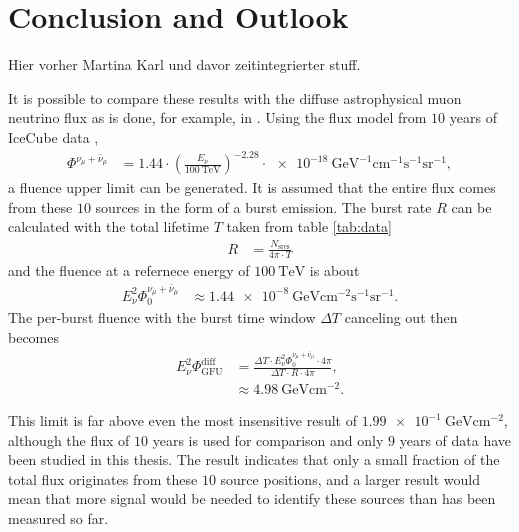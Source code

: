\chapter{Conclusion and Outlook} \label{sec:outlook}

Hier vorher Martina Karl und davor zeitintegrierter stuff.

It is possible to compare these results with the diffuse astrophysical muon neutrino flux as is done, for example, in \cite{thorben}.
Using the flux model from $\num{10}$ years of IceCube data \cite{flux_2},
\begin{align}
  \Phi^{\nu_\mu + \bar{\nu}_\mu} &= 1.44\cdot\left(\frac{E_\nu}{\SI{100}{\tera\electronvolt}}\right)^{-2.28}\cdot\SI{e-18}{\giga\electronvolt\tothe{-1}\centi\meter\tothe{-1}\second\tothe{-1}\steradian\tothe{-1}},
\end{align}
a fluence upper limit can be generated.
It is assumed that the entire flux comes from these $\num{10}$ sources in the form of a burst emission.
The burst rate $R$ can be calculated with the total lifetime $T$ taken from table \ref{tab:data}
\begin{align}
  R &= \frac{N_\text{srcs}}{4\pi\cdot T}
\end{align}
and the fluence at a refernece energy of $\SI{100}{\tera\electronvolt}$ is about
\begin{align}
  E^2_\nu\Phi_0^{\nu_\mu + \bar{\nu}_\mu} &\approx \SI{1.44e-8}{\giga\electronvolt\centi\meter\tothe{-2}\second\tothe{-1}\steradian\tothe{-1}}.
\end{align}
The per-burst fluence with the burst time window $\Delta T$ canceling out then becomes
\begin{align}
  E^2_\nu\Phi_\text{GFU}^\text{diff} &= \frac{\Delta T \cdot E^2_\nu\Phi_0^{\nu_\mu + \bar{\nu}_\mu} \cdot 4\pi}{\Delta T \cdot R \cdot 4\pi},\\
  &\approx \SI{4.98}{\giga\electronvolt\centi\meter\tothe{-2}}.
\end{align}

This limit is far above even the most insensitive result of $\SI{1.99e-1}{\giga\electronvolt\centi\meter\tothe{-2}}$, although the flux of $\num{10}$ years is used for comparison and only $\num{9}$ years of data have been studied in this thesis.
The result indicates that only a small fraction of the total flux originates from these $10$ source positions, and a larger result would mean that more signal would be needed to identify these sources than has been measured so far.

